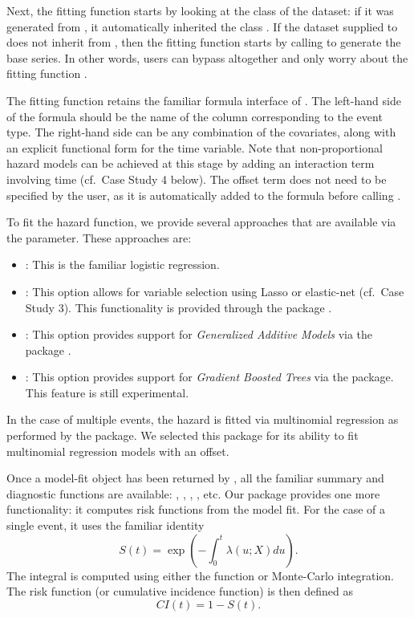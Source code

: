 \documentclass[
]{jss}
\providecommand{\tightlist}{%
  \setlength{\itemsep}{0pt}\setlength{\parskip}{0pt}}
\begin{document}
Next, the fitting function  starts by looking at
the class of the dataset: if it was generated from
, it automatically inherited the class
. If the dataset supplied to  does
not inherit from , then the fitting function starts by
calling  to generate the base series. In other
words, users can bypass  altogether and only worry
about the fitting function .

The fitting function retains the familiar formula interface of
. The left-hand side of the formula should be the name of the
column corresponding to the event type. The right-hand side can be any
combination of the covariates, along with an explicit functional form
for the time variable. Note that non-proportional hazard models can be
achieved at this stage by adding an interaction term involving time
(cf.~Case Study 4 below). The offset term does not need to be specified
by the user, as it is automatically added to the formula before calling
.

To fit the hazard function, we provide several approaches that are
available via the  parameter. These approaches are:

\begin{itemize}
\tightlist
\item
  : This is the familiar logistic regression.
\item
  : This option allows for variable selection using Lasso
  or elastic-net (cf.~Case Study 3). This functionality is provided
  through the  package \citep{friedman2010jss}.
\item
  : This option provides support for \emph{Generalized
  Additive Models} via the  package
  \citep{hastie1987generalized}.
\item
  : This option provides support for \emph{Gradient Boosted
  Trees} via the  package. This feature is still experimental.
\end{itemize}

In the case of multiple events, the hazard is fitted via multinomial
regression as performed by the  package. We selected this
package for its ability to fit multinomial regression models with an
offset.

Once a model-fit object has been returned by , all
the familiar summary and diagnostic functions are available:
, , , , etc. Our
package provides one more functionality: it computes risk functions from
the model fit. For the case of a single event, it uses the familiar
identity \begin{equation}\label{eqn:surv}
S(t) = \exp\left(-\int_0^t \lambda(u;X) du\right).
\end{equation} The integral is computed using either the
 function or Monte-Carlo integration. The risk
function (or cumulative incidence function) is then defined as
\begin{equation}\label{eqn:CI}
CI(t) = 1 - S(t).
\end{equation}
\end{document}

